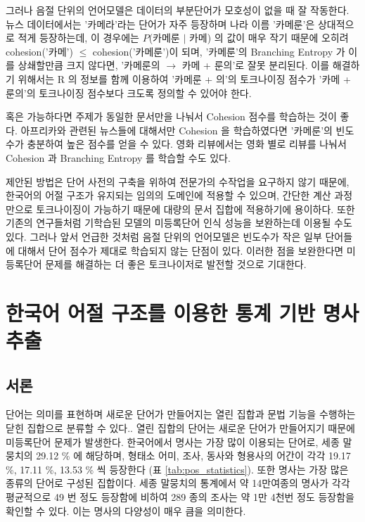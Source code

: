 \documentclass[oneside, ko,phd]{snuthesis_utf8_kor}
\begin{document}
그러나 음절 단위의 언어모델은 데이터의 부분단어가 모호성이 없을 때 잘 작동한다.
뉴스 데이터에서는 '카메라'라는 단어가 자주 등장하며 나라 이름 '카메룬'은 상대적으로 적게 등장하는데, 이 경우에는 $P$(카메룬 $\vert$ 카메) 의 값이 매우 작기 때문에 오히려 cohesion('카메') $\le$ cohesion('카메룬')이 되며, '카메룬'의 Branching Entropy 가 이를 상쇄할만큼 크지 않다면, '카메룬의 $\rightarrow$ 카메 + 룬의'로 잘못 분리된다.
이를 해결하기 위해서는 R 의 정보를 함께 이용하여 '카메룬 + 의'의 토크나이징 점수가 '카메 + 룬의'의 토크나이징 점수보다 크도록 정의할 수 있어야 한다.

혹은 가능하다면 주제가 동일한 문서만을 나눠서 Cohesion 점수를 학습하는 것이 좋다.
아프리카와 관련된 뉴스들에 대해서만 Cohesion 을 학습하였다면 '카메룬'의 빈도수가 충분하여 높은 점수를 얻을 수 있다.
영화 리뷰에서는 영화 별로 리뷰를 나눠서 Cohesion 과 Branching Entropy 를 학습할 수도 있다.

제안된 방법은 단어 사전의 구축을 위하여 전문가의 수작업을 요구하지 않기 때문에, 한국어의 어절 구조가 유지되는 임의의 도메인에 적용할 수 있으며, 간단한 계산 과정만으로 토크나이징이 가능하기 때문에 대량의 문서 집합에 적용하기에 용이하다.
또한 기존의 \cite{zhao2007incorporating, zhao2011integrating, zheng2013deep} 연구들처럼 기학습된 모델의 미등록단어 인식 성능을 보완하는데 이용될 수도 있다.
그러나 앞서 언급한 것처럼 음절 단위의 언어모델은 빈도수가 작은 일부 단어들에 대해서 단어 점수가 제대로 학습되지 않는 단점이 있다.
이러한 점을 보완한다면 미등록단어 문제를 해결하는 더 좋은 토크나이저로 발전할 것으로 기대한다.


\newpage
\chapter{한국어 어절 구조를 이용한 통계 기반 명사 추출} \label{noun_extraction}

\section{서론}

단어는 의미를 표현하며 새로운 단어가 만들어지는 열린 집합과 문법 기능을 수행하는 닫힌 집합으로 분류할 수 있다.\cite{jurafsky2000speech}.
열린 집합의 단어는 새로운 단어가 만들어지기 때문에 미등록단어 문제가 발생한다.
한국어에서 명사는 가장 많이 이용되는 단어로, 세종 말뭉치의 29.12 \% 에 해당하며, 형태소 어미, 조사, 동사와 형용사의 어간이 각각 19.17 \%, 17.11 \%, 13.53 \% 씩 등장한다 (표 \ref{tab:pos_statistics}).
또한 명사는 가장 많은 종류의 단어로 구성된 집합이다.
세종 말뭉치의 통계에서 약 14만여종의 명사가 각각 평균적으로 49 번 정도 등장함에 비하여 289 종의 조사는 약 1만 4천번 정도 등장함을 확인할 수 있다.
이는 명사의 다양성이 매우 큼을 의미한다.
\end{document}
